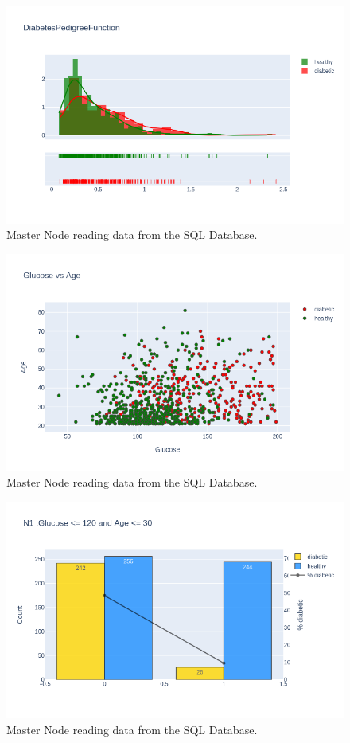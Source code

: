 \documentclass[12pt]{article}
\begin{document}
\begin{figure}[ht]
\centering
\includegraphics[width=1\textwidth]{newplot(11).png}
\caption{Master Node reading data from the SQL Database.}
\end{figure}

\begin{figure}[ht]
\centering
\includegraphics[width=1\textwidth]{newplot(12).png}
\caption{Master Node reading data from the SQL Database.}
\end{figure}

\begin{figure}[ht]
\centering
\includegraphics[width=1\textwidth]{newplot(13).png}
\caption{Master Node reading data from the SQL Database.}
\end{figure}
\end{document}

